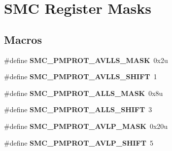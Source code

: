 \hypertarget{group___s_m_c___register___masks}{}\section{S\+M\+C Register Masks}
\label{group___s_m_c___register___masks}
\subsection*{Macros}
\begin{DoxyCompactItemize}
\item 
\hypertarget{group___s_m_c___register___masks_ga62e9f3c7e74a3e5b80b0fae8a896640d}{}\#define {\bfseries S\+M\+C\+\_\+\+P\+M\+P\+R\+O\+T\+\_\+\+A\+V\+L\+L\+S\+\_\+\+M\+A\+S\+K}~0x2u\label{group___s_m_c___register___masks_ga62e9f3c7e74a3e5b80b0fae8a896640d}

\item 
\hypertarget{group___s_m_c___register___masks_gad625b387a627eb3a69f3a26edc0096b8}{}\#define {\bfseries S\+M\+C\+\_\+\+P\+M\+P\+R\+O\+T\+\_\+\+A\+V\+L\+L\+S\+\_\+\+S\+H\+I\+F\+T}~1\label{group___s_m_c___register___masks_gad625b387a627eb3a69f3a26edc0096b8}

\item 
\hypertarget{group___s_m_c___register___masks_ga79d87e312be895d4f2bdfdda8c947600}{}\#define {\bfseries S\+M\+C\+\_\+\+P\+M\+P\+R\+O\+T\+\_\+\+A\+L\+L\+S\+\_\+\+M\+A\+S\+K}~0x8u\label{group___s_m_c___register___masks_ga79d87e312be895d4f2bdfdda8c947600}

\item 
\hypertarget{group___s_m_c___register___masks_gac6cb1305b9cb329a8bb903036893db11}{}\#define {\bfseries S\+M\+C\+\_\+\+P\+M\+P\+R\+O\+T\+\_\+\+A\+L\+L\+S\+\_\+\+S\+H\+I\+F\+T}~3\label{group___s_m_c___register___masks_gac6cb1305b9cb329a8bb903036893db11}

\item 
\hypertarget{group___s_m_c___register___masks_ga30602dafb393b5d9c52f0c75e1d78210}{}\#define {\bfseries S\+M\+C\+\_\+\+P\+M\+P\+R\+O\+T\+\_\+\+A\+V\+L\+P\+\_\+\+M\+A\+S\+K}~0x20u\label{group___s_m_c___register___masks_ga30602dafb393b5d9c52f0c75e1d78210}

\item 
\hypertarget{group___s_m_c___register___masks_gae13777e671c1caf2d10809999574fed4}{}\#define {\bfseries S\+M\+C\+\_\+\+P\+M\+P\+R\+O\+T\+\_\+\+A\+V\+L\+P\+\_\+\+S\+H\+I\+F\+T}~5\label{group___s_m_c___register___masks_gae13777e671c1caf2d10809999574fed4}


\end{DoxyCompactItemize}
